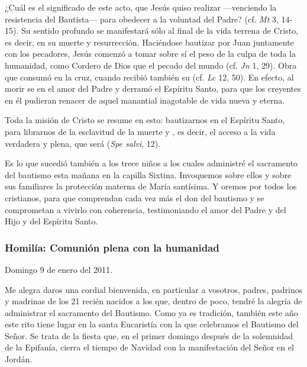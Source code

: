 {¿Cuál es el significado de este acto, que Jesús quiso realizar ---venciendo la resistencia del Bautista--- para obedecer a la voluntad del Padre? (cf. \emph{Mt} 3, 14-15). Su sentido profundo se manifestará sólo al final de la vida terrena de Cristo, es decir, en su muerte y resurrección. Haciéndose bautizar por Juan juntamente con los pecadores, Jesús comenzó a tomar sobre sí el peso de la culpa de toda la humanidad, como Cordero de Dios que  el pecado del mundo (cf. \emph{Jn} 1, 29). Obra que consumó en la cruz, cuando recibió también su  (cf. \emph{Lc} 12, 50). En efecto, al morir se  en el amor del Padre y derramó el Espíritu Santo, para que los creyentes en él pudieran renacer de aquel manantial inagotable de vida nueva y eterna.

Toda la misión de Cristo se resume en esto: bautizarnos en el Espíritu Santo, para librarnos de la esclavitud de la muerte y , es decir, el acceso a la vida verdadera y plena, que será  (\emph{Spe salvi}, 12).

Es lo que sucedió también a los trece niños a los cuales administré el sacramento del bautismo esta mañana en la capilla Sixtina. Invoquemos sobre ellos y sobre sus familiares la protección materna de María santísima. Y oremos por todos los cristianos, para que comprendan cada vez más el don del bautismo y se comprometan a vivirlo con coherencia, testimoniando el amor del Padre y del Hijo y del Espíritu Santo.

\subsubsection{Homilía: Comunión plena con la humanidad}

Domingo 9 de enero del 2011.

Me alegra daros una cordial bienvenida, en particular a vosotros, padres, padrinos y madrinas de los 21 recién nacidos a los que, dentro de poco, tendré la alegría de administrar el sacramento del Bautismo. Como ya es tradición, también este año este rito tiene lugar en la santa Eucaristía con la que celebramos el Bautismo del Señor. Se trata de la fiesta que, en el primer domingo después de la solemnidad de la Epifanía, cierra el tiempo de Navidad con la manifestación del Señor en el Jordán.

}
